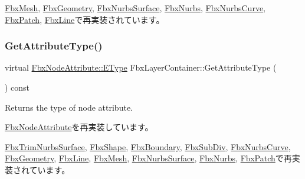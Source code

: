 \hyperlink{class_fbx_mesh_a1755e89d515fadbc2d52924917b618f7}{Fbx\+Mesh}, \hyperlink{class_fbx_geometry_a07e94f7801067d66429afbf1799795cd}{Fbx\+Geometry}, \hyperlink{class_fbx_nurbs_surface_ab9ff252170ad2dc35958af782962a5c9}{Fbx\+Nurbs\+Surface}, \hyperlink{class_fbx_nurbs_a8a5ea388bc948e47ab65e1705f98f402}{Fbx\+Nurbs}, \hyperlink{class_fbx_nurbs_curve_a8c562cccf434c37cb3aad0df27d60e86}{Fbx\+Nurbs\+Curve}, \hyperlink{class_fbx_patch_a7e094310626891214577dabe4ff145f9}{Fbx\+Patch}, \hyperlink{class_fbx_line_a92abd64f6b58057c899bf5733a2e2275}{Fbx\+Line}で再実装されています。

\mbox{\label{class_fbx_layer_container_a578a24bfcd49464813a4b5b08a12ec59}} 
\subsubsection{\texorpdfstring{Get\+Attribute\+Type()}{GetAttributeType()}}
{\footnotesize\ttfamily virtual \hyperlink{class_fbx_node_attribute_a08e1669d3d1a696910756ab17de56d6a}{Fbx\+Node\+Attribute\+::\+E\+Type} Fbx\+Layer\+Container\+::\+Get\+Attribute\+Type (\begin{DoxyParamCaption}{ }\end{DoxyParamCaption}) const\hspace{0.3cm}{\ttfamily [virtual]}}

Returns the type of node attribute. 

\hyperlink{class_fbx_node_attribute_a1c2116756906127145a2b8721fc26752}{Fbx\+Node\+Attribute}を再実装しています。



\hyperlink{class_fbx_trim_nurbs_surface_a2d60f9613978db561ac32e2efff35104}{Fbx\+Trim\+Nurbs\+Surface}, \hyperlink{class_fbx_shape_a976141cda408244bd89c44c7a6b22d4b}{Fbx\+Shape}, \hyperlink{class_fbx_boundary_a093be9c6c0c0f13a337e9b6815aed9d0}{Fbx\+Boundary}, \hyperlink{class_fbx_sub_div_ac109cef6a177563eab80e28d414289a3}{Fbx\+Sub\+Div}, \hyperlink{class_fbx_nurbs_curve_aa6ec087af306c42ac814d43ea80c60b3}{Fbx\+Nurbs\+Curve}, \hyperlink{class_fbx_geometry_a41ae23e5d0cf08693bca49737f333de9}{Fbx\+Geometry}, \hyperlink{class_fbx_line_a3307097464d924b2c95c6687e41d69c9}{Fbx\+Line}, \hyperlink{class_fbx_mesh_a5a52e41ccf1382c40d3361ec3cfbb68a}{Fbx\+Mesh}, \hyperlink{class_fbx_nurbs_surface_a7c075984ec95a01b9cb6031e19cbd0cf}{Fbx\+Nurbs\+Surface}, \hyperlink{class_fbx_nurbs_a6c810e3a50538b346cbbf61338dca907}{Fbx\+Nurbs}, \hyperlink{class_fbx_patch_a4eb7de708949e012e0dcae2cb87a2ef4}{Fbx\+Patch}で再実装されています。

